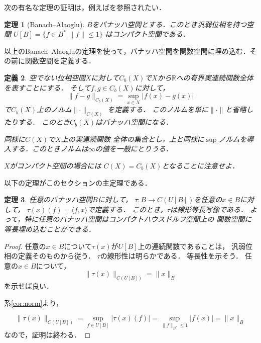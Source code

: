 \documentclass[leqno, a4paper, 12pt]{jsarticle}
\newtheorem{thm}{定理}
\newtheorem{df}[thm]{定義}
\newcommand{\rr}{\mathbb{R}}
\begin{document}
次の有名な定理の証明は，例えば\cite{kaiseki}を参照されたい．
\begin{thm}[Banach--Alaoglu]
$B$をバナッハ空間とする．このとき汎弱位相を持つ空間
$U[B]=\{f\in B^*\mid \|f\|\le 1\}$
はコンパクト空間である．
\end{thm}

以上のBanach--Alaogluの定理を使って，バナッハ空間を関数空間に埋め込む．その前に関数空間を定義する．




\begin{df}
空でない位相空間$X$に対して$C_b(X)$で$X$から$\rr$への有界実連続関数全体を表すことにする．
そして$f, g\in C_b(X)$に対して，
\[
\|f-g\|_{C_b(X)}=\sup_{x\in X}|f(x)-g(x)|
\]
で$C_b(X)$上のノルム$\lVert\cdot\rVert_{C(X)}$
を定義する．
このノルムを単に$\lVert\cdot\rVert$と省略したりする．
このとき$C_b(X)$はバナッハ空間になる．

同様に$C(X)$で$X$上の実連続関数
全体の集合とし，上と同様に$\sup$ノルムを導入する．このときノルムは$\infty$の値を一般にとりうる．

$X$がコンパクト空間の場合には
$C(X)=C_b(X)$となることに注意せよ．
\end{df}

以下の定理がこのセクションの主定理である．
\begin{thm}\label{thm:CK}
任意のバナッハ空間$B$に対して，
$\tau: B\to C(U[B])$を任意の$x\in B$に対して，
$\tau(x)(f)=\langle f, x\rangle $で定義する．
このとき，$\tau$は線形等長写像である．
よって，特に任意のバナッハ空間はコンパクトハウスドルフ空間上の
関数空間に等長埋め込むことができる．
\end{thm}
\begin{proof}
任意の$x\in B$について$\tau(x)$が$U[B]$上の連続関数であることは，
汎弱位相の定義そのものから従う．
$\tau$の線形性は明らかである．
等長性を示そう．
任意の$x\in B$について，
\[
\|\tau(x)\|_{C(U[B])}=\|x\|_B
\]
を示せば良い．

系\ref{cor:norm}より，

\[
\|\tau(x)\|_{C(U[B])}=\sup_{f\in U[B]}|\tau(x)(f)|
=\sup_{\|f\|_{B^*}\le 1}|f(x)|=\|x\|_B
\]
なので，証明は終わる．
\end{proof}


\end{document}
